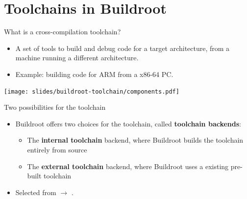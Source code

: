 \section{Toolchains in Buildroot}

\begin{frame}{What is a cross-compilation toolchain?}
  \begin{itemize}
  \item A set of tools to build and debug code for a target
    architecture, from a machine running a different architecture.
  \item Example: building code for ARM from a x86-64 PC.
  \end{itemize}
  \begin{center}
    \texttt{[image: slides/buildroot-toolchain/components.pdf]}
  \end{center}
\end{frame}

\begin{frame}{Two possibilities for the toolchain}
  \begin{itemize}
  \item Buildroot offers two choices for the toolchain, called {\bf
      toolchain backends}:
    \begin{itemize}
    \item The {\bf internal toolchain} backend, where Buildroot builds
      the toolchain entirely from source
    \item The {\bf external toolchain} backend, where Buildroot uses a
      existing pre-built toolchain
    \end{itemize}
  \item Selected from  $\rightarrow$ .
  \end{itemize}
\end{frame}

